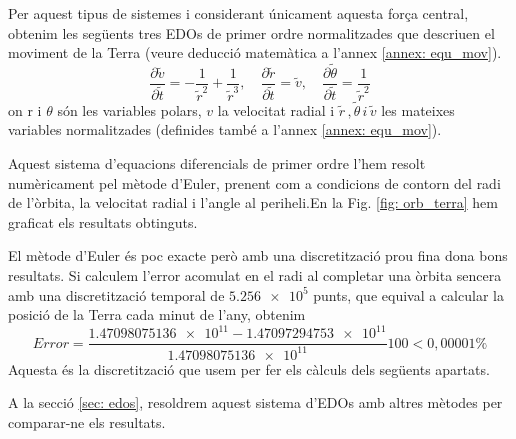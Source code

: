 \documentclass[11pt]{article}
\begin{document}
Per aquest tipus de sistemes i considerant únicament aquesta força central, obtenim les següents tres EDOs de primer ordre normalitzades que descriuen el moviment de la Terra (veure deducció matemàtica a l'annex \ref{annex: equ_mov}).
\begin{equation}
    \frac{\partial\tilde{v}}{\partial\tilde{t}}=-\frac{1}{\tilde{r}^2}+\frac{1}{\tilde{r}^3}, \quad
    \frac{\partial\tilde{r}}{\partial\tilde{t}}=\tilde{v}, \quad
    \frac{\partial\tilde{\theta}}{\partial\tilde{t}}=\frac{1}{\tilde{r}^2}
    \label{eq:all}
\end{equation}
on r i $\theta$ són les variables polars, $v$ la velocitat radial i $\tilde{r}\,, \tilde{\theta}\, i\, \tilde{v}$ les mateixes variables normalitzades (definides també a l'annex \ref{annex: equ_mov}).

Aquest sistema d'equacions diferencials de primer ordre l'hem resolt numèricament pel mètode d'Euler, prenent com a condicions de contorn del radi de l'òrbita, la velocitat radial i l'angle al periheli.\footnotemark[\value{footnote}]
En la Fig. \ref{fig: orb_terra} hem graficat els resultats obtinguts.


El mètode d'Euler és poc exacte però amb una discretització prou fina dona bons resultats. Si calculem l'error acomulat en el radi al completar una òrbita sencera amb una discretització temporal de $\num{5.256e5}$ punts, que equival a calcular la posició de la Terra cada minut de l'any, obtenim
\begin{equation}
    Error = \frac{\num{1.47098075136e11}-\num{1.47097294753e11}}{\num{1.47098075136e11}}100<0,00001\%
\end{equation}
Aquesta és la discretització que usem per fer els càlculs dels següents apartats.

A la secció \ref{sec: edos}, resoldrem aquest sistema d'EDOs amb altres mètodes per comparar-ne els resultats.
\end{document}
